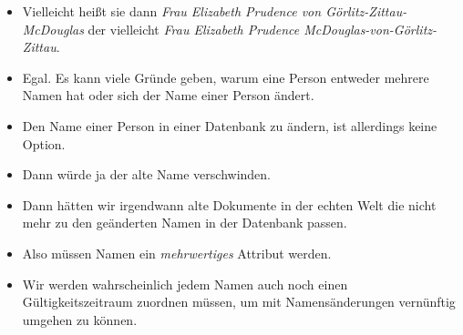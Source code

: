 \documentclass[aspectratio=169,mathserif,notheorems]{beamer}%
\begin{document}
\begin{frame}
\begin{itemize}
\item<18-> Vielleicht heißt sie dann \emph{Frau Elizabeth Prudence von G{\"o}rlitz-Zittau-McDouglas} der vielleicht \emph{Frau Elizabeth Prudence McDouglas-von-G{\"o}rlitz-Zittau}.
\item<19-> Egal. Es kann viele Gründe geben, warum eine Person entweder mehrere Namen hat oder sich der Name einer Person ändert.%
%
\item<20-> Den Name einer Person in einer Datenbank zu \alert{ändern}, ist allerdings \alert{keine Option}.%
\item<21-> Dann würde ja der alte Name verschwinden.%
\item<22-> Dann hätten wir irgendwann alte Dokumente in der echten Welt die nicht mehr zu den geänderten Namen in der Datenbank passen.%
\item<23-> Also müssen Namen ein \emph{mehrwertiges} Attribut werden.%
\item<24-> Wir werden wahrscheinlich jedem Namen auch noch einen Gültigkeitszeitraum zuordnen müssen, um mit Namensänderungen vernünftig umgehen zu können.%
\end{itemize}%
\end{frame}%
%
\end{document}
